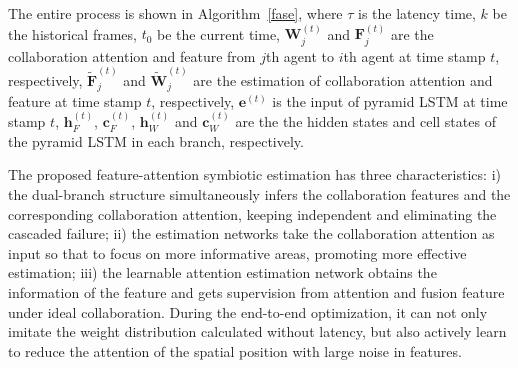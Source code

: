 \documentclass[runningheads]{llncs}
\begin{document}



The entire process is shown in Algorithm~\ref{fase}, where $\tau$ is the latency time, $k$ be the historical frames, $t_0$ be the current time, $\mathbf{W}_j^{\left(t\right)}$ and $\mathbf{F}_j^{\left(t\right)}$ are the collaboration attention and feature from $j$th agent to $i$th agent at time stamp $t$, respectively, $\widetilde{\mathbf{F}}_j^{\left(t\right)}$ and $\widetilde{\mathbf{W}}_j^{\left(t\right)}$ are the estimation of collaboration attention and feature at time stamp $t$, respectively, $\mathbf{e}^{\left(t\right)}$ is the input of pyramid LSTM at time stamp $t$, $\mathbf{h}^{\left(t\right)}_F$, $\mathbf{c}^{\left(t\right)}_F$, $\mathbf{h}^{\left(t\right)}_W$ and $\mathbf{c}^{\left(t\right)}_W$ are the the hidden states and cell states of the pyramid LSTM in each branch, respectively. 

The proposed feature-attention symbiotic estimation has three characteristics: i) the dual-branch structure simultaneously infers the collaboration features and the corresponding collaboration  attention, keeping independent and eliminating the cascaded failure; ii) the estimation networks take the collaboration attention as input so that to focus on more informative areas, promoting more effective estimation; iii) the learnable attention estimation network obtains the information of the feature and gets supervision from attention and fusion feature under ideal collaboration. During the end-to-end optimization, it can not only imitate the weight distribution calculated without latency, but also actively learn to reduce the attention of the spatial position with large noise in features.




\end{document}
